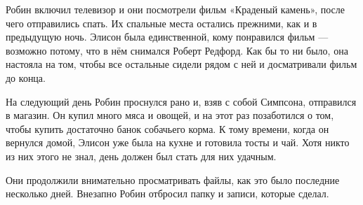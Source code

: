 \documentclass[a4paper,12pt]{book}
\begin{document}
	Робин включил телевизор и они посмотрели фильм «Краденый камень», после чего отправились спать. Их спальные места остались прежними, как и в предыдущую ночь. Элисон была единственной, кому понравился фильм — возможно потому, что в нём снимался Роберт Редфорд. Как бы то ни было, она настояла на том, чтобы все остальные сидели рядом с ней и досматривали фильм до конца.

	На следующий день Робин проснулся рано и, взяв с собой Симпсона, отправился в магазин. Он купил много мяса и овощей, и на этот раз позаботился о том, чтобы купить достаточно банок собачьего корма.
	К тому времени, когда он вернулся домой, Элисон уже была на кухне и готовила тосты и чай. Хотя никто из них этого не знал, день должен был стать для них удачным.

	Они продолжили внимательно просматривать файлы, как это было последние несколько дней. Внезапно Робин отбросил папку и записи, которые сделал.
\end{document}
